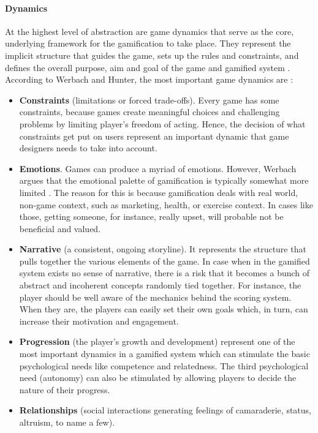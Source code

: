 \paragraph{Dynamics}
At the highest level of abstraction are game dynamics that serve as the core, underlying framework for the gamification to take place. They represent the implicit structure that guides the game, sets up the rules and constraints, and defines the overall purpose, aim and goal of the game and gamified system \cite{werbach2012win, WerbachCoursera}. According to Werbach and Hunter, the most important game dynamics are \cite{werbach2012win}:
\begin{itemize}
\item \textbf{Constraints} (limitations or forced trade-offs). Every game has some constraints, because games create meaningful choices and challenging problems by limiting player's freedom of acting. Hence, the decision of what constraints get put on users represent an important dynamic that game designers needs to take into account. 
\item \textbf{Emotions}. Games can produce a myriad of
emotions. However, Werbach argues that the emotional palette of gamification is typically somewhat more limited \cite{WerbachCoursera}. The reason for this is because gamification deals with real world, non-game context, such as marketing, health, or exercise context. In cases like those, getting someone, for instance, really upset, will probable not be beneficial and valued.
\item \textbf{Narrative} (a consistent, ongoing storyline). It represents the structure that pulls together the various elements of the game. In case when in the gamified system exists no sense of narrative, there is a risk that it becomes a bunch of abstract and incoherent concepts randomly tied together. For instance, the player should be well aware of the mechanics behind the scoring system. When they are, the players can easily set their own goals which, in turn, can increase their motivation and engagement.
\item \textbf{Progression} (the player's growth and development) represent one of the most important dynamics in a gamified system which can stimulate the basic psychological needs like competence and relatedness. The third psychological need (autonomy) can also be stimulated by allowing players to decide the nature of their progress.
\item \textbf{Relationships} (social interactions generating feelings of camaraderie, status, altruism, to name a few).
\end{itemize}
